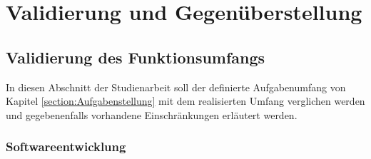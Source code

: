 
\chapter{Validierung und Gegenüberstellung}

\section{Validierung des Funktionsumfangs}

In diesen Abschnitt der Studienarbeit soll der definierte Aufgabenumfang von Kapitel \ref{section:Aufgabenstellung} mit dem realisierten Umfang verglichen werden und gegebenenfalls vorhandene Einschränkungen erläutert werden.

\subsection{Softwareentwicklung}



